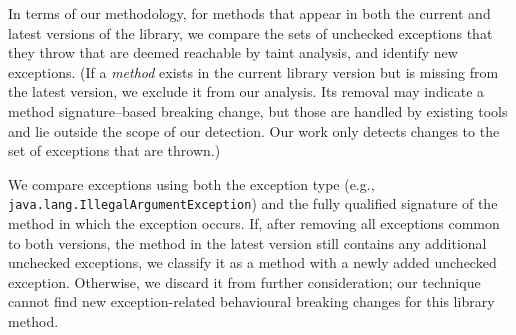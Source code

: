 


In terms of our methodology, for methods that appear in both the current and latest versions of the library, we compare the sets of unchecked exceptions that they throw that are deemed reachable by taint analysis, and identify new exceptions. (If a \emph{method} exists in the current library version but is missing from the latest version, we exclude it from our analysis. Its removal may indicate a method signature–based breaking change, but those are handled by existing tools and lie outside the scope of our detection. Our work only detects changes to the set of exceptions that are thrown.)

We compare exceptions using both the exception type (e.g., \texttt{java.lang.IllegalArgumentException}) and the fully qualified signature of the method in which the exception occurs. If, after removing all exceptions common to both versions, the method in the latest version still contains any additional unchecked exceptions, we classify it as a method with a newly added unchecked exception. Otherwise, we discard it from further consideration; our technique cannot find new exception-related behavioural breaking changes for this library method.

